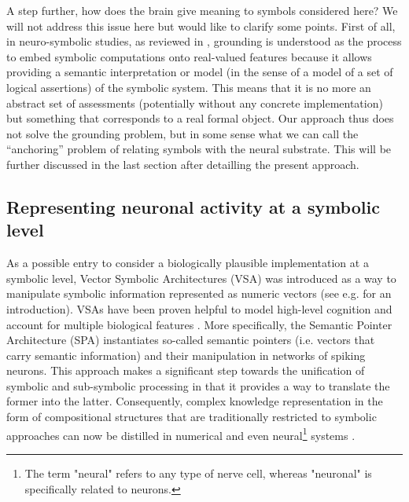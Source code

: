 \documentclass[sn-mathphys]{sn-jnl}
\begin{document}
A step further, how does the brain give meaning to symbols considered here? We will not address this issue here but would like to clarify some points. First of all, in neuro-symbolic studies, as reviewed in \cite{garcez_neurosymbolic_2020}, grounding is understood as the process to embed symbolic computations onto real-valued features \cite{badreddine_logic_2021} because it allows providing a semantic interpretation or model (in the sense of a model of a set of logical assertions) of the symbolic system. This means that it is no more an abstract set of assessments (potentially without any concrete implementation) but something that corresponds to a real formal object. 
Our approach thus does not solve the grounding problem, but in some sense what we can call the ``anchoring'' problem of relating symbols with the neural substrate. This will be further discussed in the last section after detailling the present approach.


\subsection{Representing neuronal activity at a symbolic level}

As a possible entry to consider a biologically plausible implementation at a symbolic level, Vector Symbolic Architectures (VSA) was introduced as a way to manipulate symbolic information represented as numeric vectors (see e.g. \cite{levy_vector_2008} for an introduction). VSAs have been proven helpful to model high-level cognition and account for multiple biological features \cite{gayler_vector_2003,eliasmith_how_2013}. More specifically, the Semantic Pointer Architecture (SPA) \cite{eliasmith_how_2013} instantiates so-called semantic pointers (i.e. vectors that carry semantic information) and their manipulation in networks of spiking neurons. This approach makes a significant step towards the unification of symbolic and sub-symbolic processing in that it provides a way to translate the former into the latter. Consequently, complex knowledge representation in the form of compositional structures that are traditionally restricted to symbolic approaches can now be distilled in numerical and even neural\footnote{The term "neural" refers to any type of nerve cell, whereas "neuronal" is specifically related to neurons.} systems \cite{crawford_biologically_2016}.
\end{document}
